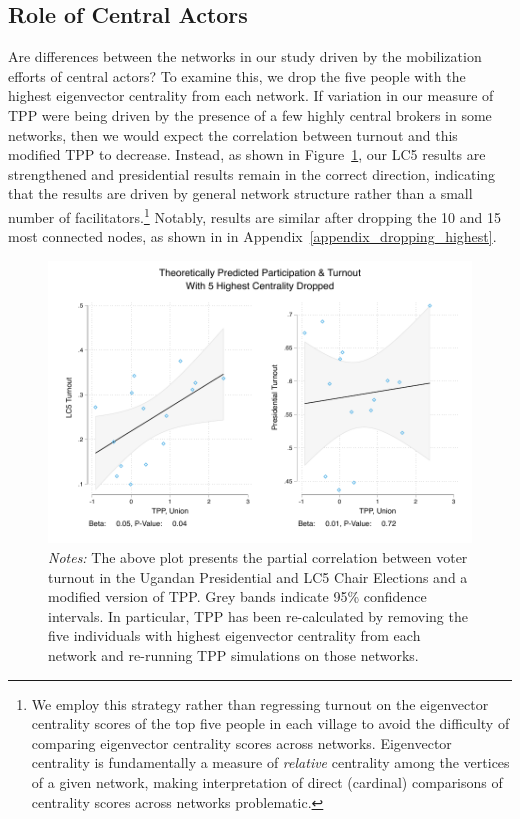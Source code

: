 \documentclass[12pt]{article}
\begin{document}
\subsection{Role of Central Actors}\label{section_centralactors}

Are differences between the networks in our study driven by the mobilization efforts of central actors? To examine this, we drop the five people with the highest eigenvector centrality from each network. If variation in our measure of TPP were being driven by the presence of a few highly central brokers in some networks, then we would expect the correlation between turnout and this modified TPP to decrease. Instead, as shown in Figure~\ref{figure_context_voting_scatter_drop5}, our LC5 results are strengthened and presidential results remain in the correct direction, indicating that the results are driven by general network structure rather than a small number of facilitators.\footnote{We employ this strategy rather than regressing turnout on the eigenvector centrality scores of the top five people in each village to avoid the difficulty of comparing eigenvector centrality scores across networks. Eigenvector centrality is fundamentally a measure of \emph{relative} centrality among the vertices of a given network, making interpretation of direct (cardinal) comparisons of centrality scores across networks problematic.} Notably, results are similar after dropping the 10 and 15 most connected nodes, as shown in in Appendix~\ref{appendix_dropping_highest}.

\begin{figure}
	    \caption{}\label{figure_context_voting_scatter_drop5}
    		\includegraphics[width=\textwidth]{../3_results/context_voting_scatter_drop5.pdf}
	\scriptsize{\emph{Notes:}  The above plot presents the partial correlation between voter turnout in the Ugandan Presidential and LC5 Chair Elections and a modified version of TPP.  Grey bands indicate 95\% confidence intervals. In particular, TPP has been re-calculated by removing the five individuals with highest eigenvector centrality from each network and re-running TPP simulations on those networks.}
\end{figure}
\end{document}
